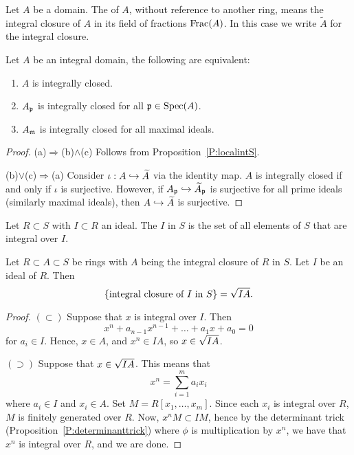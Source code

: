 \documentclass{ximera}
\begin{document}
\begin{definition}
  Let $A$ be a domain. The  of $A$, without
  reference to another ring, means the integral closure of $A$ in its
  field of fractions $\operatorname{Frac}(A)$. In this case we write $\tilde{A}$ for
  the integral closure.
\end{definition}



\begin{proposition}
  Let $A$ be an integral domain, the following are equivalent:
  \begin{enumerate}
  \item $A$ is integrally closed.
  \item $A_{\mathfrak{p}}$ is integrally closed for all $\mathfrak{p}\in\operatorname{Spec}(A)$.
  \item $A_{\mathfrak{m}}$ is integrally closed for all maximal ideals.
  \end{enumerate}
  \begin{proof}
    (a)$\Rightarrow$(b)$\wedge$(c) Follows from Proposition~\ref{P:localintS}.

    (b)$\vee$(c)$\Rightarrow$(a) Consider $\iota: A\hookrightarrow\widetilde{A}$ via
    the identity map. $A$ is integrally closed if and only if $\iota$
    is surjective. However, if $A_{\mathfrak{p}}\hookrightarrow\widetilde{A}_{\mathfrak{p}}$ is surjective
    for all prime ideals (similarly maximal ideals), then
    $A\hookrightarrow\widetilde{A}$ is surjective.
  \end{proof}
\end{proposition}


\begin{definition}
   Let $R\subset S$ with $I\subset R$ an ideal. The  $I$ in $S$ is the set of all elements of $S$
   that are integral over $I$.
\end{definition}


\begin{proposition}\label{P:intideal}
  Let $R\subset A\subset S$ be rings with $A$ being the integral
  closure of $R$ in $S$. Let $I$ be an ideal of $R$. Then
  \[
  \{\text{integral closure of $I$ in $S$}\} = \sqrt{IA}.
  \]
  \begin{proof}
    $(\subset)$ Suppose that $x$ is integral over $I$. Then
    \[
    x^n + a_{n-1}x^{n-1} + \dots + a_1 x + a_0 = 0
    \]
    for $a_i\in I$. Hence, $x\in A$, and $x^n\in IA$, so $x\in
    \sqrt{IA}$.

    $(\supset)$ Suppose that $x\in\sqrt{IA}$. This means that
    \[
    x^n = \sum_{i=1}^m a_i x_i
    \]
    where $a_i\in I$ and $x_i\in A$. Set $M = R[x_1,\dots,
      x_m]$. Since each $x_i$ is integral over $R$, $M$ is finitely
    generated over $R$. Now, $x^n M \subset I M$, hence by the
    determinant trick (Proposition~\ref{P:determinanttrick}) where
    $\phi$ is multiplication by $x^n$, we have that $x^n$ is integral
    over $R$, and we are done.
  \end{proof}
\end{proposition}
\end{document}
